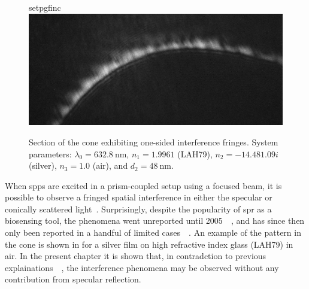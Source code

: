 \begin{figure}[ht]
  \centering
  {setpgfinc}
  \includegraphics[keepaspectratio,width=15.5cm]{interference/figures/coneintro.png}
  \caption{Section of the cone exhibiting one-sided interference fringes.
    System parameters: $\lambda_0 = \SI{632.8}{\nano\meter}$,
    $n_1=1.9961$ (LAH79), $n_2 = \num{-14.48+1.09i}$ (silver), $n_3=1.0$
    (air), and $d_2=\SI{48}{\nano\meter}$.}
  \label{fig:coneintrofig}
\end{figure}
When \glspl{spp} are excited in a prism-coupled setup using a focused beam, it is
possible to observe a fringed spatial interference in either the
specular or conically scattered light~\cite{webster2013interference}.
Surprisingly, despite the popularity of \gls{spr} as a biosensing tool, the
phenomena went unreported until
2005~\cite{schumann2008near}~\cite{andaloro2005optical}, and has since then
only been reported in a handful of limited
cases~\cite{shan2009measuring}~\cite{simon2007observation}.  An example of the
pattern in the cone is shown in  for a silver film on
high refractive index glass (LAH79) in air.  In the present chapter it is
shown that, in contradction to previous
explainations~\cite{schumann2008near}~\cite{andaloro2005optical}, the
interference phenomena may be observed without any contribution from specular
reflection.

